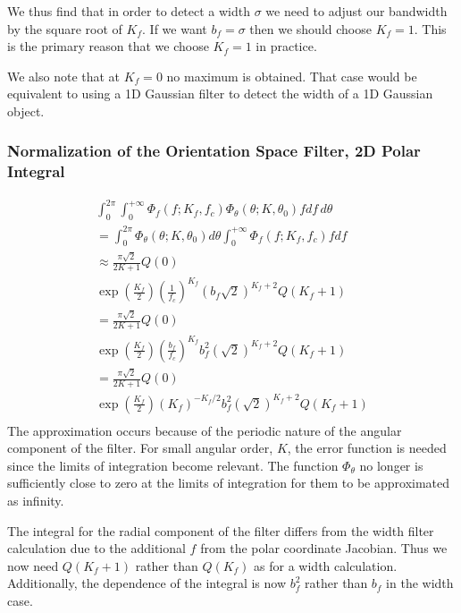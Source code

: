 \documentclass{article}
\begin{document}
We thus find that in order to detect a width $ \sigma $ we need to adjust our bandwidth by the square root of $ K_f $. If we want $ b_f = \sigma $ then we should choose $ K_f = 1 $. This is the primary reason that we choose $ K_f = 1 $ in practice.

We also note that at $ K_f = 0 $ no maximum is obtained. That case would be equivalent to using a 1D Gaussian filter to detect the width of a 1D Gaussian object.
\subsubsection{Normalization of the Orientation Space Filter, 2D Polar Integral}
\begin{eqnarray}
\int_0^{2 \pi} \int_0^{+\infty} \Phi_f(f; K_f, f_c) \Phi_\theta(\theta; K, \theta_0) f df \, d\theta \\
 = \int_0^{2 \pi} \Phi_\theta(\theta; K, \theta_0) d\theta
 \int_0^{+\infty} \Phi_f(f; K_f, f_c)  f df \\
 \approx \frac{\pi \sqrt{2}}{2K+1}  Q(0) \\
 \exp \left(\frac{K_f}{2} \right)
            \left( \frac{1}{f_c} \right)^{K_f}
            \left( b_f \sqrt{2} \right)^{K_f+2}
            Q(K_f + 1) \\
             = \frac{\pi \sqrt{2}}{2K+1}  Q(0) \\
 \exp \left(\frac{K_f}{2} \right)
            \left( \frac{b_f}{f_c} \right)^{K_f}
            b_f^2
            \left( \sqrt{2} \right)^{K_f+2}
            Q(K_f + 1) \\            
             = \frac{\pi \sqrt{2}}{2K+1}  Q(0) \\
 \exp \left(\frac{K_f}{2} \right)
            \left( K_f \right)^{-K_f/2}
            b_f^2
            \left( \sqrt{2} \right)^{K_f+2}
            Q(K_f + 1) \\      
\end{eqnarray}
The approximation occurs because of the periodic nature of the angular component of the filter. For small angular order, $ K $, the error function is needed since the limits of integration become relevant. The function $ \Phi_\theta $ no longer is sufficiently close to zero at the limits of integration for them to be approximated as infinity.

The integral for the radial component of the filter differs from the width filter calculation due to the additional $ f $ from the polar coordinate Jacobian. Thus we now need $ Q(K_f+1) $ rather than $ Q(K_f) $ as for a width calculation. Additionally, the dependence of the integral is now $ b_f^2 $ rather than $ b_f $ in the width case.
\end{document}
